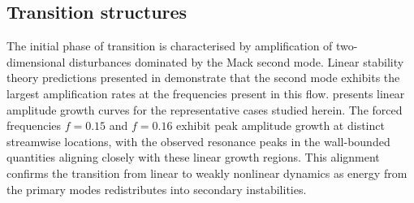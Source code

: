 



\subsection{Transition structures}

The initial phase of transition is characterised by amplification of two-dimensional disturbances dominated by the Mack second mode. Linear stability theory predictions presented in  demonstrate that the second mode exhibits the largest amplification rates at the frequencies present in this flow.  presents linear amplitude growth curves for the representative cases studied herein. The forced frequencies $f = 0.15$ and $f = 0.16$ exhibit peak amplitude growth at distinct streamwise locations, with the observed resonance peaks in the wall-bounded quantities aligning closely with these linear growth regions. This alignment confirms the transition from linear to weakly nonlinear dynamics as energy from the primary modes redistributes into secondary instabilities.

